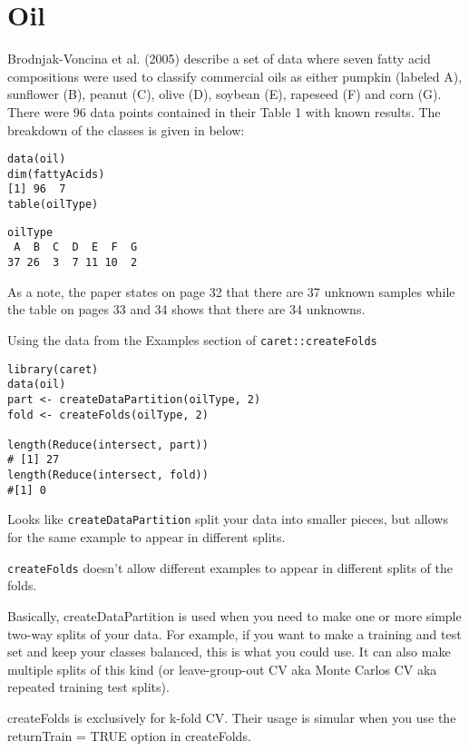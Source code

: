 
\section{Oil}

Brodnjak-Voncina et al. (2005) describe a set of data where seven fatty acid compositions were used to classify commercial oils as either pumpkin (labeled A), sunflower (B), peanut (C), olive (D), soybean (E), rapeseed (F) and corn (G). There were 96 data points contained in their Table 1 with known results. The breakdown of the classes is given in below:

\begin{framed}
\begin{verbatim}
data(oil)
dim(fattyAcids)
[1] 96  7
table(oilType)
\end{verbatim}
\end{framed}
\begin{verbatim}
oilType
 A  B  C  D  E  F  G 
37 26  3  7 11 10  2 
\end{verbatim}
As a note, the paper states on page 32 that there are 37 unknown samples while the table on pages 33 and 34 shows that there are 34 unknowns.


Using the data from the Examples section of \texttt{caret::createFolds}

\begin{framed}
\begin{verbatim}
library(caret) 
data(oil) 
part <- createDataPartition(oilType, 2) 
fold <- createFolds(oilType, 2) 

length(Reduce(intersect, part)) 
# [1] 27 
length(Reduce(intersect, fold)) 
#[1] 0 

\end{verbatim}
\end{framed}

Looks like \texttt{createDataPartition} split your data into smaller pieces, 
but allows for the same example to appear in different splits. 

\texttt{createFolds} doesn't allow different examples to appear in different 
splits of the folds. 


Basically, createDataPartition is used when you need to make one or 
more simple two-way splits of your data. For example, if you want to 
make a training and test set and keep your classes balanced, this is 
what you could use. It can also make multiple splits of this kind (or 
leave-group-out CV aka Monte Carlos CV aka repeated training test 
splits). 

createFolds is exclusively for k-fold CV. Their usage is simular when 
you use the returnTrain = TRUE option in createFolds. 


